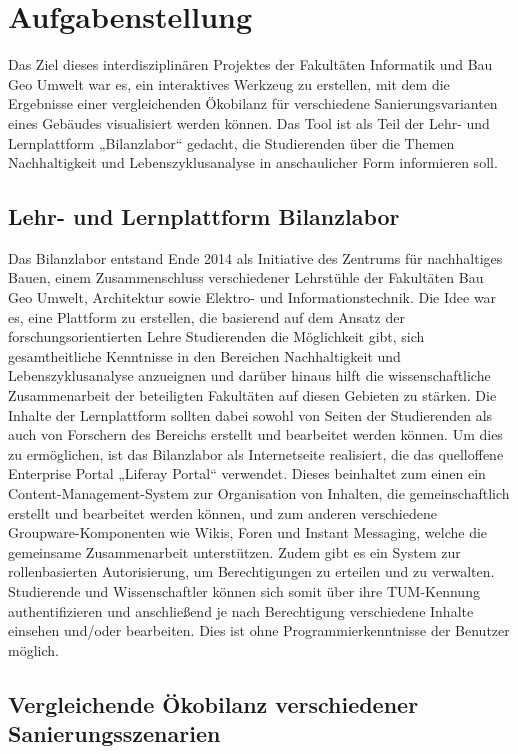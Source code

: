 
\chapter{Aufgabenstellung}
Das Ziel dieses interdisziplinären Projektes der Fakultäten Informatik und Bau Geo Umwelt war es, ein interaktives Werkzeug zu erstellen, mit dem die Ergebnisse einer vergleichenden Ökobilanz für verschiedene Sanierungsvarianten eines Gebäudes visualisiert werden können. Das Tool ist als Teil der Lehr- und Lernplattform „Bilanzlabor“ gedacht, die Studierenden über die Themen Nachhaltigkeit und Lebenszyklusanalyse in anschaulicher Form informieren soll.
\section{Lehr- und Lernplattform Bilanzlabor}
Das Bilanzlabor entstand Ende 2014 als Initiative des Zentrums für nachhaltiges Bauen, einem Zusammenschluss verschiedener Lehrstühle der Fakultäten Bau Geo Umwelt, Architektur sowie Elektro- und Informationstechnik. Die Idee war es, eine Plattform zu erstellen, die basierend auf dem Ansatz der forschungsorientierten Lehre Studierenden die Möglichkeit gibt, sich gesamtheitliche Kenntnisse in den Bereichen Nachhaltigkeit und Lebenszyklusanalyse anzueignen und darüber hinaus hilft die wissenschaftliche Zusammenarbeit der beteiligten Fakultäten auf diesen Gebieten zu stärken. Die Inhalte der Lernplattform sollten dabei sowohl von Seiten der Studierenden als auch von Forschern des Bereichs erstellt und bearbeitet werden können. Um dies zu ermöglichen, ist das Bilanzlabor als Internetseite realisiert, die das quelloffene Enterprise Portal „Liferay Portal“ verwendet. Dieses beinhaltet zum einen ein Content-Management-System zur Organisation von Inhalten, die gemeinschaftlich erstellt und bearbeitet werden können, und zum anderen verschiedene Groupware-Komponenten wie Wikis, Foren und Instant Messaging, welche die gemeinsame Zusammenarbeit unterstützen. Zudem gibt es ein System zur rollenbasierten Autorisierung, um Berechtigungen zu erteilen und zu verwalten. Studierende und Wissenschaftler können sich somit über ihre TUM-Kennung authentifizieren und anschließend je nach Berechtigung verschiedene Inhalte einsehen und/oder bearbeiten. Dies ist ohne Programmierkenntnisse der Benutzer möglich.
\section{Vergleichende Ökobilanz verschiedener Sanierungsszenarien}


